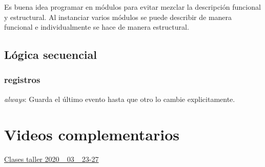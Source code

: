 \documentclass[12pt,letterpaper]{book}
\begin{document}
Es buena idea programar en módulos para evitar mezclar la descripción funcional y estructural. Al instanciar varios módulos se puede describir de manera funcional e individualmente se hace de manera estructural. 


\section{Lógica secuencial}
\subsection{registros}

\textit{always}: Guarda el último evento hasta que otro lo cambie explicitamente.


\chapter{Videos complementarios}

\href{https://www.youtube.com/watch?v=ypz23yWrwf0&feature=youtu.be}{Clases taller 2020\_ 03\_ 23-27 }\\












 
\end{document}
